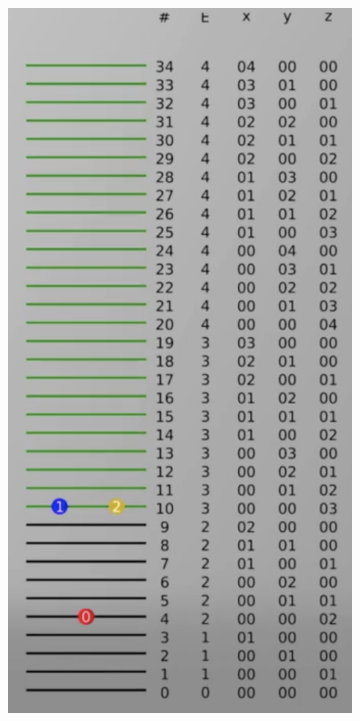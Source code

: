 \begin{figure}[ht]
    \begin{subfigure}{0.33\columnwidth}
        \centering\includegraphics[width=\linewidth]{fig/putting-particles}

\end{subfigure}
\end{figure}
